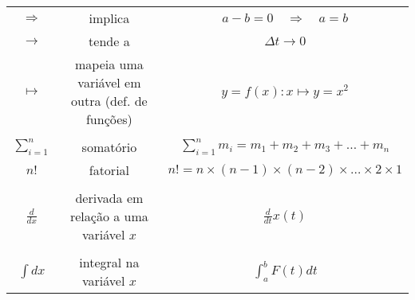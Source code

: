 \begin{table*}[!ht]
\begin{tabular}{ccc}
\\
$\Rightarrow$ & implica & $a - b = 0 \quad \Rightarrow \quad a = b$\\
$\to$ & tende a & $\Delta t \to 0$ \\
$\mapsto$ & mapeia uma variável em outra (def. de funções) & $y=f(x): x\mapsto y=x^2$ \\
\\
$\sum_{i=1}^n$ & somatório & $\sum_{i=1}^{n} m_i = m_1 + m_2 + m_3 + \dots + m_n$ \\
$n!$ & fatorial & $n! = n \times (n-1) \times (n-2) \times \dots \times 2 \times 1$ \\
\\
$\frac{d}{dx}$ & derivada em relação a uma variável $x$ & $\frac{d}{dt} x(t)$ \\
\\
$\int dx$ & integral na variável $x$ & $\int_a^b F(t)dt$ \\
\bottomrule
\end{tabular}
\end{table*}

\hfill
\pagebreak
